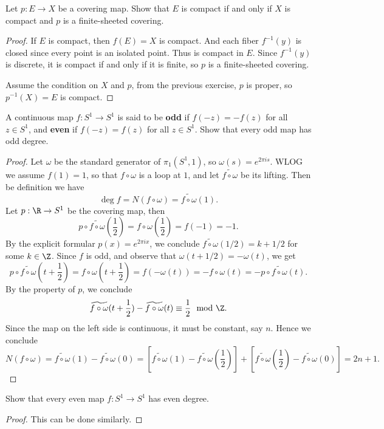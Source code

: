\begin{exercise}
Let $p:E\to X$ be a covering map. Show that $E$ is compact if and only if $X$ is compact and $p$ is a finite-sheeted covering.
\end{exercise}
\begin{proof}
If $E$ is compact, then $f(E)=X$ is compact. And each fiber $f^{-1}(y)$ is closed since every point is an isolated point. Thus is compact in $E$. Since $f^{-1}(y)$ is discrete, it is compact if and only if it is finite, so $p$ is a finite-sheeted covering.\par
Assume the condition on $X$ and $p$, from the previous exercise, $p$ is proper, so $p^{-1}(X)=E$ is compact.
\end{proof}
\begin{exercise}
A continuous map $f:S^1\to S^1$ is said to be \textbf{odd} if $f(-z)=-f(z)$ for all $z\in S^1$, and \textbf{even} if $f(-z)=f(z)$ for all $z\in S^1$. Show that every odd map has odd degree.
\end{exercise}
\begin{proof}
Let $\omega$ be the standard generator of $\pi_1(S^1,1)$, so $\omega(s)=e^{2\pi is}$. WLOG we assume $f(1)=1$, so that $f\circ\omega$ is a loop at $1$, and let $\widetilde{f\circ\omega}$ be its lifting. Then be definition we have
\[\deg f=N(f\circ\omega)=\widetilde{f\circ\omega}(1).\]
Let $p:\R\to S^1$ be the covering map, then
\[p\circ\widetilde{f\circ\omega}(\dfrac{1}{2})=f\circ\omega(\dfrac{1}{2})=f(-1)=-1.\]
By the explicit formular $p(x)=e^{2\pi ix}$, we conclude $\widetilde{f\circ\omega}(1/2)=k+1/2$ for some $k\in\Z$. Since $f$ is odd, and observe that $\omega(t+1/2)=-\omega(t)$, we get
\[p\circ\widetilde{f\circ\omega}(t+\dfrac{1}{2})=f\circ\omega(t+\dfrac{1}{2})=f(-\omega(t))=-f\circ\omega(t)=-p\circ\widetilde{f\circ\omega}(t).\]
By the property of $p$, we conclude
\[\widetilde{f\circ\omega}(t+\dfrac{1}{2})-\widetilde{f\circ\omega}(t)\equiv\dfrac{1}{2}\mod\Z.\]
Since the map on the left side is continuous, it must be constant, say $n$. Hence we conclude
\[N(f\circ\omega)=\widetilde{f\circ\omega}(1)-\widetilde{f\circ\omega}(0)=[\widetilde{f\circ\omega}(1)-\widetilde{f\circ\omega}(\dfrac{1}{2})]+[\widetilde{f\circ\omega}(\dfrac{1}{2})-\widetilde{f\circ\omega}(0)]=2n+1.\]
\end{proof}
\begin{exercise}
Show that every even map $f:S^1\to S^1$ has even degree.
\end{exercise}
\begin{proof}
This can be done similarly.
\end{proof}
